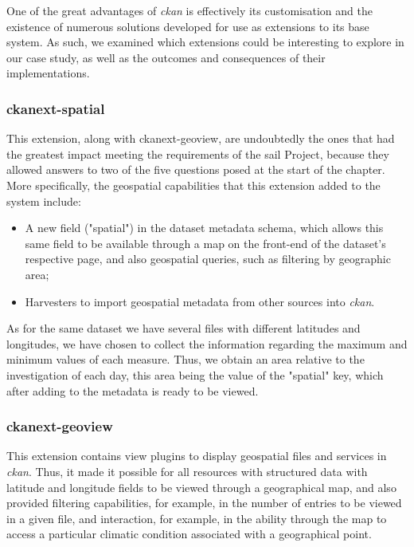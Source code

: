   One of the great advantages of \textit{\gls{ckan}} is effectively its customisation and the existence of numerous solutions developed for use as extensions to its base system. As such, we examined which extensions could be interesting to explore in our case study, as well as the outcomes and consequences of their implementations.
  
  \subsubsection{ckanext-spatial}
  
  This extension, along with ckanext-geoview, are undoubtedly the ones that had the greatest impact meeting the requirements of the \gls{sail} Project, because they allowed answers to two of the five questions posed at the start of the chapter. More specifically, the geospatial capabilities that this extension added to the system include:
  
  \begin{itemize}
      \item A new field ("spatial") in the dataset metadata schema, which allows this same field to be available through a map on the front-end of the dataset's respective page, and also geospatial queries, such as filtering by geographic area;
      \item Harvesters to import geospatial metadata from other sources into \textit{\gls{ckan}}.
  \end{itemize}
  
  As for the same dataset we have several files with different latitudes and longitudes, we have chosen to collect the information regarding the maximum and minimum values of each measure. Thus, we obtain an area relative to the investigation of each day, this area being the value of the "spatial" key, which after adding to the metadata is ready to be viewed.

  \subsubsection{ckanext-geoview}
  
  This extension contains view plugins to display geospatial files and services in \textit{\gls{ckan}}. Thus, it made it possible for all resources with structured data with latitude and longitude fields to be viewed through a geographical map, and also provided filtering capabilities, for example, in the number of entries to be viewed in a given file, and interaction, for example, in the ability through the map to access a particular climatic condition associated with a geographical point.
  
